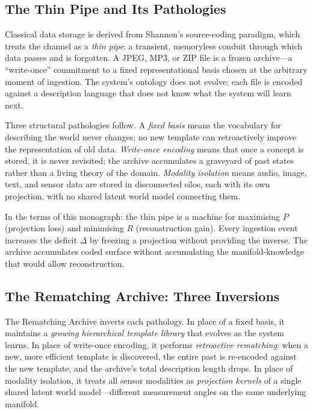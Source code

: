 \documentclass[12pt, letterpaper]{article}
\theoremstyle{remark}
\begin{document}
\subsection{The Thin Pipe and Its Pathologies}

Classical data storage is derived from Shannon's source-coding paradigm,
which treats the channel as a \emph{thin pipe}: a transient, memoryless
conduit through which data passes and is forgotten.  A JPEG, MP3, or ZIP
file is a frozen archive---a ``write-once'' commitment to a fixed
representational basis chosen at the arbitrary moment of ingestion.  The
system's ontology does not evolve; each file is encoded against a
description language that does not know what the system will learn next.

Three structural pathologies follow.  A \emph{fixed basis} means the
vocabulary for describing the world never changes; no new template can
retroactively improve the representation of old data.  \emph{Write-once
encoding} means that once a concept is stored, it is never revisited; the
archive accumulates a graveyard of past states rather than a living theory
of the domain.  \emph{Modality isolation} means audio, image, text, and
sensor data are stored in disconnected silos, each with its own projection,
with no shared latent world model connecting them.

In the terms of this monograph: the thin pipe is a machine for maximising
$P$ (projection loss) and minimising $R$ (reconstruction gain).  Every
ingestion event increases the deficit $\Delta$ by freezing a projection
without providing the inverse.  The archive accumulates coded surface
without accumulating the manifold-knowledge that would allow reconstruction.

\subsection{The Rematching Archive: Three Inversions}

The Rematching Archive inverts each pathology.  In place of a fixed basis,
it maintains a \emph{growing hierarchical template library} that evolves as
the system learns.  In place of write-once encoding, it performs
\emph{retroactive rematching}: when a new, more efficient template is
discovered, the entire past is re-encoded against the new template, and the
archive's total description length drops.  In place of modality isolation,
it treats all sensor modalities as \emph{projection kernels} of a single
shared latent world model---different measurement angles on the same
underlying manifold.
\end{document}

